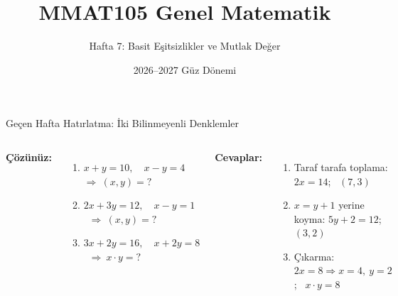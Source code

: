 \documentclass[aspectratio=169,11pt]{beamer}
\title[MMAT105 -- Hafta 7]{MMAT105 Genel Matematik}
\subtitle{Hafta 7: Basit Eşitsizlikler ve Mutlak Değer}
\author{}
\date{2026--2027 Güz Dönemi}
\begin{document}
\begin{frame}
\titlepage
\end{frame}


\begin{frame}{Geçen Hafta Hatırlatma: İki Bilinmeyenli Denklemler}
\begin{columns}[t]
\textbf{Çözünüz:}
\begin{enumerate}
\item \(x+y=10,\quad x-y=4\) \ \(\Rightarrow\ (x,y)=?\)
\item \(2x+3y=12,\quad x-y=1\) \ \(\Rightarrow\ (x,y)=?\)
\item \(3x+2y=16,\quad x+2y=8\) \ \(\Rightarrow\ x\cdot y=?\)
\end{enumerate}
\pause
\textbf{Cevaplar:}
\begin{enumerate}
\item Taraf tarafa toplama: \(2x=14\); \ \((7,3)\)
\item \(x=y+1\) yerine koyma: \(5y+2=12\); \ \((3,2)\)
\item Çıkarma: \(2x=8\Rightarrow x=4,\ y=2\); \ \(x\cdot y=8\)
\end{enumerate}
\end{columns}
\end{frame}
\end{document}
